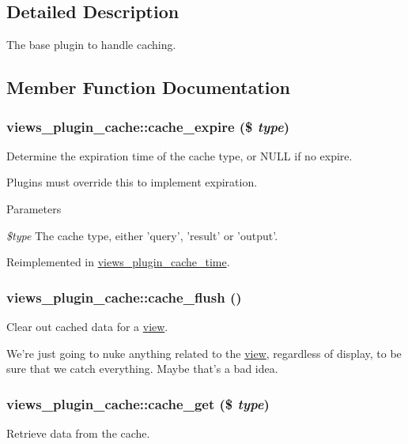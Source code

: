 \subsection{Detailed Description}
The base plugin to handle caching. 

\subsection{Member Function Documentation}
\hypertarget{classviews__plugin__cache_ababefa702965b1e9123a9cdc620f7d52}{
\subsubsection[{cache\_\-expire}]{\setlength{\rightskip}{0pt plus 5cm}views\_\-plugin\_\-cache::cache\_\-expire (\$ {\em type})}}
\label{classviews__plugin__cache_ababefa702965b1e9123a9cdc620f7d52}
Determine the expiration time of the cache type, or NULL if no expire.

Plugins must override this to implement expiration.


\begin{DoxyParams}{Parameters}
\item[{\em \$type}]The cache type, either 'query', 'result' or 'output'. \end{DoxyParams}


Reimplemented in \hyperlink{classviews__plugin__cache__time_a6e04720a6807812cfb5840ea7b49baaa}{views\_\-plugin\_\-cache\_\-time}.\hypertarget{classviews__plugin__cache_a412bdc7ee43c6c26903d22b636ea96c8}{
\subsubsection[{cache\_\-flush}]{\setlength{\rightskip}{0pt plus 5cm}views\_\-plugin\_\-cache::cache\_\-flush ()}}
\label{classviews__plugin__cache_a412bdc7ee43c6c26903d22b636ea96c8}
Clear out cached data for a \hyperlink{classview}{view}.

We're just going to nuke anything related to the \hyperlink{classview}{view}, regardless of display, to be sure that we catch everything. Maybe that's a bad idea. \hypertarget{classviews__plugin__cache_a77d1ef6d62d4eb84209cf310194b173b}{
\subsubsection[{cache\_\-get}]{\setlength{\rightskip}{0pt plus 5cm}views\_\-plugin\_\-cache::cache\_\-get (\$ {\em type})}}
\label{classviews__plugin__cache_a77d1ef6d62d4eb84209cf310194b173b}
Retrieve data from the cache.

